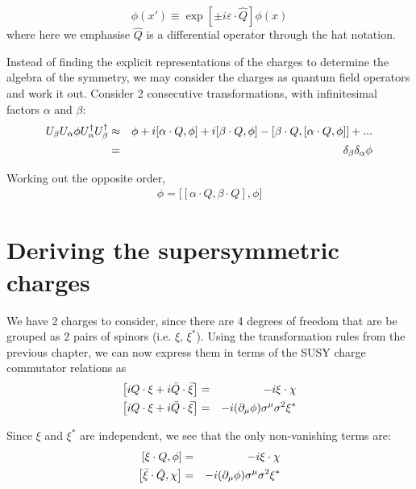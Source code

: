 \begin{equation}
    \phi(x') \equiv \exp[\pm i \varepsilon\cdot\hat{Q}]\phi(x)
    \label{eqn:6:charge as differential operator}
\end{equation}
where here we emphasise $\hat{Q}$ is a differential operator through the hat notation.

Instead of finding the explicit representations of the charges to determine the algebra of the symmetry, we may consider the charges as quantum field operators and work it out. Consider 2 consecutive transformations, with infinitesimal factors $\alpha$ and $\beta$:
\begin{eqnarray}
    U_\beta U_\alpha \phi U_\alpha^\dagger U_\beta^\dagger &\approx& \phi + i [\alpha\cdot Q, \phi] + i [\beta\cdot Q, \phi] - [\beta\cdot Q, [\alpha\cdot Q, \phi]] + ... \nonumber \\
    &=& \delta_\beta \delta_\alpha \phi
\end{eqnarray}

Working out the opposite order,
\begin{eqnarray}
    [\delta_\beta, \delta_\alpha] \phi = \big[[\alpha\cdot Q, \beta\cdot Q], \phi\big] 
    \label{eqn:6:charge as quantum field operators}
\end{eqnarray}

\section{Deriving the supersymmetric charges}
We have 2 charges to consider, since there are 4 degrees of freedom that are be grouped as 2 pairs of spinors (i.e. $\xi$, $\xi^*$). Using the transformation rules from the previous chapter, we can now express them in terms of the SUSY charge commutator relations as
\begin{eqnarray}
    \left[i Q \cdot \xi + i \Bar{Q} \cdot \Bar{\xi} \right] &=& - i \xi \cdot \chi \\
    \label{eqn:6:boson transformation rule full}
    \left[i Q \cdot \xi + i \Bar{Q} \cdot \Bar{\xi} \right] &=& - i (\partial_\mu \phi) \sigma^\mu \sigma^2 \xi^*
    \label{eqn:6:fermion transformation rule full}
\end{eqnarray}

Since $\xi$ and $\xi^*$ are independent, we see that the only non-vanishing terms are:
\begin{eqnarray}
    \left[ \xi\cdot Q, \phi\right] &=& -i \xi \cdot \chi \\
    \label{eqn:6:boson transformation rule}
    \left[\Bar{\xi}\cdot\Bar{Q}, \chi\right] &=& -i (\partial_\mu \phi) \sigma^\mu \sigma^2 \xi^*
    \label{eqn:6:fermion transformation rule}
\end{eqnarray}


